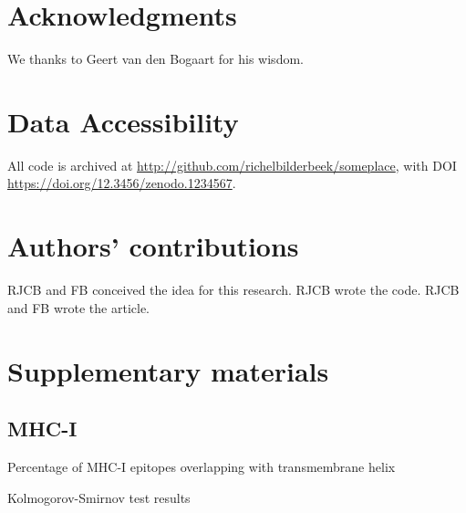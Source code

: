 \documentclass{article}
\begin{document}
\section{Acknowledgments}

We thanks to Geert van den Bogaart for his wisdom.

\section{Data Accessibility}

All code is archived at \url{http://github.com/richelbilderbeek/someplace},
with DOI \url{https://doi.org/12.3456/zenodo.1234567}.

\section{Authors' contributions}

RJCB and FB conceived the idea for this research. 
RJCB wrote the code.
RJCB and FB wrote the article.





\appendix
\section{Supplementary materials}

\subsection{MHC-I}

\begin{table}
  
  \caption{Percentage of MHC-I epitopes overlapping with transmembrane helix}
  \label{table:1}
\end{table}

\begin{table}
  
  \caption{Kolmogorov-Smirnov test results}
  \label{table:ks}
\end{table}
\end{document}
